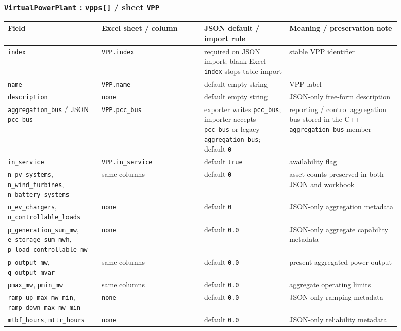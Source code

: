 \subsubsection*{\texttt{VirtualPowerPlant} : \texttt{vpps[]} / sheet \texttt{VPP}}

\begin{longtable}{L{0.20\linewidth}L{0.24\linewidth}L{0.20\linewidth}L{0.26\linewidth}}
\toprule
Field & Excel sheet / column & JSON default / import rule & Meaning / preservation note \\
\midrule
\endhead
\texttt{index} & \texttt{VPP.index} & required on JSON import; blank Excel \texttt{index} stops table import & stable VPP identifier \\
\texttt{name} & \texttt{VPP.name} & default empty string & VPP label \\
\texttt{description} & \texttt{none} & default empty string & JSON-only free-form description \\
\texttt{aggregation\_bus} / JSON \texttt{pcc\_bus} & \texttt{VPP.pcc\_bus} & exporter writes \texttt{pcc\_bus}; importer accepts \texttt{pcc\_bus} or legacy \texttt{aggregation\_bus}; default \texttt{0} & reporting / control aggregation bus stored in the C++ \texttt{aggregation\_bus} member \\
\texttt{in\_service} & \texttt{VPP.in\_service} & default \texttt{true} & availability flag \\
\texttt{n\_pv\_systems}, \texttt{n\_wind\_turbines}, \texttt{n\_battery\_systems} & same columns & default \texttt{0} & asset counts preserved in both JSON and workbook \\
\texttt{n\_ev\_chargers}, \texttt{n\_controllable\_loads} & \texttt{none} & default \texttt{0} & JSON-only aggregation metadata \\
\texttt{p\_generation\_sum\_mw}, \texttt{e\_storage\_sum\_mwh}, \texttt{p\_load\_controllable\_mw} & \texttt{none} & default \texttt{0.0} & JSON-only aggregate capability metadata \\
\texttt{p\_output\_mw}, \texttt{q\_output\_mvar} & same columns & default \texttt{0.0} & present aggregated power output \\
\texttt{pmax\_mw}, \texttt{pmin\_mw} & same columns & default \texttt{0.0} & aggregate operating limits \\
\texttt{ramp\_up\_max\_mw\_min}, \texttt{ramp\_down\_max\_mw\_min} & \texttt{none} & default \texttt{0.0} & JSON-only ramping metadata \\
\texttt{mtbf\_hours}, \texttt{mttr\_hours} & \texttt{none} & default \texttt{0.0} & JSON-only reliability metadata \\
\bottomrule
\end{longtable}


